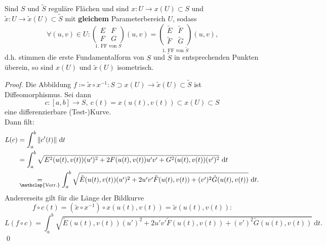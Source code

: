 \begin{theorem}
  Sind $ S $ und $ \tilde{S} $ reguläre Flächen und sind $ x: U \to x(U) \subset S $ und $ \tilde{x}: U \to \tilde{x}(U) \subset \tilde{S} $ mit \textbf{gleichem} Parameterbereich $ U $, sodass
  \begin{equation*}
    \forall (u,v) \in U : \underset{\text{1. FF von } S}{\begin{pmatrix}
      E & F \\
      F & G
    \end{pmatrix}}(u,v) = \underset{\text{1. FF von } \tilde{S}}{\begin{pmatrix}
      \tilde{E} & \tilde{F} \\
      \tilde{F} & \tilde{G}
    \end{pmatrix}}(u,v)\text{,}
  \end{equation*}
  d.h. stimmen die erste Fundamentalform von $ S $ und $ \tilde{S} $ in entsprechenden Punkten überein, so sind $ x(U) $ und $ \tilde{x}(U) $ isometrisch.
  \begin{proof}
    Die Abbildung $ f \coloneqq \tilde{x} \circ x^{-1}: S \supset x(U) \to \tilde{x}(U) \subset \tilde{S} $ ist Diffeomorphismus. Sei dann
    \begin{equation*}
      c: [a,b] \to S, \ c(t) = x(u(t),v(t)) \subset x(U) \subset S
    \end{equation*}
    eine differenzierbare (Test-)Kurve. \\
    Dann filt:
    \begin{align*}
      L(c) &= \int_a^b \Vert c'(t) \Vert \ \text{d}t \\
      &= \int_a^b \sqrt{E^2(u(t),v(t))(u')^2 + 2F(u(t),v(t))u'v' + G^2(u(t),v(t))(v')^2} \ \text{d}t \\
      &\underset{\mathclap{\text{Vorr.}}}{=} \int_a^b \sqrt{\tilde{E}(u(t),v(t))(u')^2 + 2u'v'\tilde{F}(u(t),v(t)) + (v')^2\tilde{G}(u(t),v(t))} \ \text{d}t\text{.}
    \end{align*}
    Andererseits gilt für die Länge der Bildkurve
    \begin{equation*}
      f \circ c(t) = (\tilde{x} \circ x^{-1}) \circ x(u(t),v(t)) = \tilde{x}(u(t),v(t))\text{:}
    \end{equation*}
    \begin{equation*}
      L(f \circ c) = \int_a^b \sqrt{\tilde{E}(u(t),v(t))(u')^2 + 2u'v' \tilde{F}(u(t),v(t)) + (v')^2\tilde{G}(u(t),v(t))} \ \text{d}t\text{.}
    \end{equation*}
    \qed
  \end{proof}
\end{theorem}


